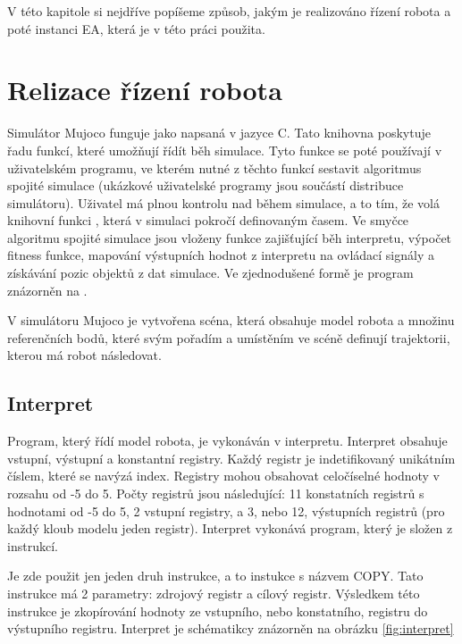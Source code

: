 
V této kapitole si nejdříve popíšeme způsob, jakým je realizováno řízení robota a poté instanci EA, která je v této práci použita.


\section{Relizace řízení robota}
Simulátor Mujoco funguje jako  napsaná v jazyce C.
Tato knihovna poskytuje řadu funkcí, které umožňují řídít běh simulace.
Tyto funkce se poté používají v uživatelském programu, ve kterém nutné z těchto funkcí sestavit algoritmus spojité simulace (ukázkové uživatelské programy jsou součástí distribuce simulátoru).
Uživatel má plnou kontrolu nad během simulace, a to tím, že volá knihovní funkci , která v simulaci pokročí definovaným časem.
Ve smyčce algoritmu spojité simulace jsou vloženy funkce zajišťující běh interpretu, výpočet fitness funkce, mapování výstupních hodnot z interpretu na ovládací signály a získávání pozic objektů z dat simulace.
Ve zjednodušené formě je program znázorněn na .

V simulátoru Mujoco je vytvořena scéna, která obsahuje model robota a množinu referenčních bodů, které svým pořadím a umístěním ve scéně definují trajektorii, kterou má robot následovat.


\subsection{Interpret}

Program, který řídí model robota, je vykonáván v interpretu.
Interpret obsahuje vstupní, výstupní a konstantní registry.
Každý registr je indetifikovaný unikátním číslem, které se navýzá index.
Registry mohou obsahovat celočíselné hodnoty v rozsahu od -5 do 5.
Počty registrů jsou následující: 11 konstatních registrů s hodnotami od -5 do 5, 2 vstupní registry, a 3, nebo 12, výstupních registrů (pro každý kloub modelu jeden registr).
Interpret vykonává program, který je složen z instrukcí.

Je zde použit jen jeden druh instrukce, a to instukce s názvem COPY.
Tato instrukce má 2 parametry: zdrojový registr a cílový registr.
Výsledkem této instrukce je zkopírování hodnoty ze vstupního, nebo konstatního, registru do výstupního registru.
Interpret je schématikcy znázorněn na obrázku \ref{fig:interpret}

